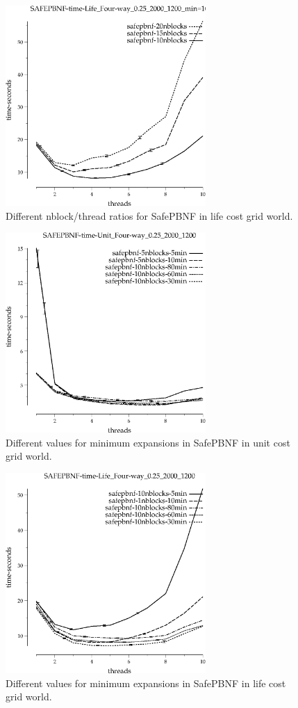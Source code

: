 \documentclass{article}
\begin{document}
\begin{figure}[h!]
\includegraphics[width=3in]{../graphs/grid_life_four-way_0.25_2000_1200/SAFEPBNF-time-Life_Four-way_0.25_2000_1200_min=10.eps}
\caption{Different nblock/thread ratios for SafePBNF in life cost grid world.}
\label{fig:SafePBNF-nblock-life}
\end{figure}

\begin{figure}[h!]
\includegraphics[width=3in]{../graphs/grid_unit_four-way_0.25_2000_1200/SAFEPBNF-time-Unit_Four-way_0.25_2000_1200.eps}
\caption{Different values for minimum expansions in SafePBNF in unit cost grid world.}
\label{fig:SafePBNF-min-grid}
\end{figure}

\begin{figure}[h!]
\includegraphics[width=3in]{../graphs/grid_life_four-way_0.25_2000_1200/SAFEPBNF-time-Life_Four-way_0.25_2000_1200.eps}
\caption{Different values for minimum expansions in SafePBNF in life cost grid world.}
\label{fig:SafePBNF-min-life}
\end{figure}
\end{document}
